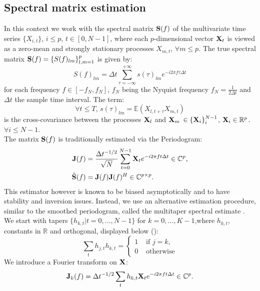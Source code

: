 \documentclass[9pt,journal]{IEEEtran}
\numberwithin{equation}{section}
\begin{document}
\subsection*{Spectral matrix estimation}
In this context we work with the spectral matrix ${\bold S}(f)$ of the multivariate time series $\{X_{i,t}\}$, $i\leq p$, $t\in [0,N-1]$, where each $p$-dimensional vector ${\bold X}_t$ is viewed as a zero-mean and strongly stationary processes $X_{m,t}$, $\forall m \leq p$. The true spectral matrix ${\bold S}(f)=\{S(f)_{lm}\}^p_{l,m=1}$ is given by:
\[S(f) _{lm}= \Delta t \sum^{+\infty}_{\tau = -\infty} s(\tau)_{lm}e^{-i2\pi f \tau \Delta t}\]
for each frequency $f \in [-f_N,f_N]$, $f_N$ being the Nyquist frequency $f_N=\frac{1}{2\Delta t}$ and $\Delta t$ the sample time interval. The term:
\begin{equation*}
\forall t \leq T \text{, }s(\tau) _{lm}= \mathbb{E}(X_{l,t+\tau}X_{m,t}) 
\end{equation*}
 is the cross-covariance between the processes ${\bold X}_l$ and ${\bold X}_m$ $ \in \{{\bold X}_i\}^{N-1}_i$, ${\bold X}_i \in \mathbb{R}^p$.  $\forall i \leq N-1 $.\\
The matrix $\bold S(f)$ is traditionally estimated via the Periodogram:
\begin{align*} {\bold J}(f) &= \frac{\Delta t^{-1/2}}{\sqrt{N}} \sum^{N-1}_{t=0} {\bold X}_t e^{-i2\pi ft \Delta t} \in \mathbb{C}^p, \\
\hat{\bold S }(f) &= {\bold J}(f){\bold J }(f)^H \in \mathbb{C}^{p\times p}.\end{align*}
This estimator however is known to be biased asymptotically and to have stability and inversion issues. Instead, we use an alternative estimation procedure, similar to the smoothed periodogram, called the multitaper spectral estimate \cite{Percival1993}.\\
 We start with tapers $\{h_{k,t} | t=0,...,N-1\}$ for $k=0,...,K-1$,where $h_{k,t}$, constants in $\mathbb{R}$ and orthogonal, displayed below (\cite{Medkour2010}):
\begin{equation}
 \sum_t h_{j,t}h_{k,t} = \left\{ \begin{array}{cc}1 & \mbox{ if } j=k, \\ 0 & \mbox{ otherwise} \end{array} \right.
\label{eq:tapers}
\end{equation}
We introduce a Fourier transform on $\bold X$:
\begin{equation}
{\bold J}_k(f) = \Delta t^{-1/2} \sum_t h_{k,t}{\bold X}_te^{-i2\pi ft \Delta t} \in \mathbb{C}^p.
\label{eq:multitaperdef}
\end{equation}
\end{document}
